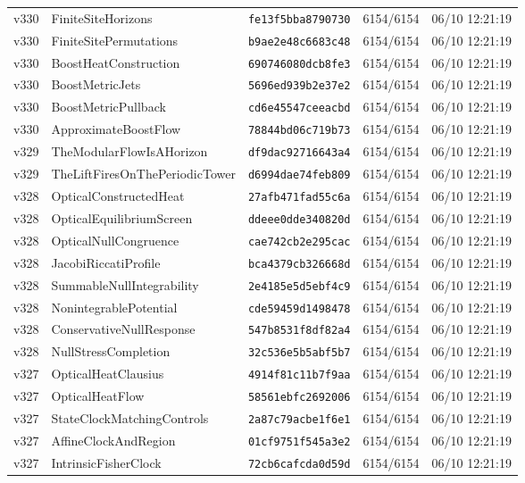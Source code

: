 \documentclass[11pt]{article}
\theoremstyle{definition}\newtheorem{deriv}{Derivation}
\begin{document}
{\begin{longtable}{@{}lllll@{}}
v330 & FiniteSiteHorizons & \texttt{fe13f5bba8790730} & 6154/6154 & 06/10 12:21:19 \\
v330 & FiniteSitePermutations & \texttt{b9ae2e48c6683c48} & 6154/6154 & 06/10 12:21:19 \\
v330 & BoostHeatConstruction & \texttt{690746080dcb8fe3} & 6154/6154 & 06/10 12:21:19 \\
v330 & BoostMetricJets & \texttt{5696ed939b2e37e2} & 6154/6154 & 06/10 12:21:19 \\
v330 & BoostMetricPullback & \texttt{cd6e45547ceeacbd} & 6154/6154 & 06/10 12:21:19 \\
v330 & ApproximateBoostFlow & \texttt{78844bd06c719b73} & 6154/6154 & 06/10 12:21:19 \\
v329 & TheModularFlowIsAHorizon & \texttt{df9dac92716643a4} & 6154/6154 & 06/10 12:21:19 \\
v329 & TheLiftFiresOnThePeriodicTower & \texttt{d6994dae74feb809} & 6154/6154 & 06/10 12:21:19 \\
v328 & OpticalConstructedHeat & \texttt{27afb471fad55c6a} & 6154/6154 & 06/10 12:21:19 \\
v328 & OpticalEquilibriumScreen & \texttt{ddeee0dde340820d} & 6154/6154 & 06/10 12:21:19 \\
v328 & OpticalNullCongruence & \texttt{cae742cb2e295cac} & 6154/6154 & 06/10 12:21:19 \\
v328 & JacobiRiccatiProfile & \texttt{bca4379cb326668d} & 6154/6154 & 06/10 12:21:19 \\
v328 & SummableNullIntegrability & \texttt{2e4185e5d5ebf4c9} & 6154/6154 & 06/10 12:21:19 \\
v328 & NonintegrablePotential & \texttt{cde59459d1498478} & 6154/6154 & 06/10 12:21:19 \\
v328 & ConservativeNullResponse & \texttt{547b8531f8df82a4} & 6154/6154 & 06/10 12:21:19 \\
v328 & NullStressCompletion & \texttt{32c536e5b5abf5b7} & 6154/6154 & 06/10 12:21:19 \\
v327 & OpticalHeatClausius & \texttt{4914f81c11b7f9aa} & 6154/6154 & 06/10 12:21:19 \\
v327 & OpticalHeatFlow & \texttt{58561ebfc2692006} & 6154/6154 & 06/10 12:21:19 \\
v327 & StateClockMatchingControls & \texttt{2a87c79acbe1f6e1} & 6154/6154 & 06/10 12:21:19 \\
v327 & AffineClockAndRegion & \texttt{01cf9751f545a3e2} & 6154/6154 & 06/10 12:21:19 \\
v327 & IntrinsicFisherClock & \texttt{72cb6cafcda0d59d} & 6154/6154 & 06/10 12:21:19 \\

\end{longtable}}
\end{document}
